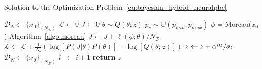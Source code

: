 \begin{algorithm}
    \caption{Solution to the Optimization Problem~\eqref{eq:bayesian_hybrid_neuralpbc}}
    \label{algo:bayes_neuralpbc}
    \small
    \begin{algorithmic}[1]
        \algrenewcommand\algorithmicindent{0em} %
        \State $\mathcal{D}_N \gets \{x_0\}_{(N_{\mathcal{D}})}$   
        \algrenewcommand\algorithmicindent{1.1em} %
        \State $\mathcal{L} \gets 0$ 
         
        \State $J \gets 0$ 
        \State $\theta \sim Q(\theta; z)$ 
            \State $p_s \sim \mathbb{U}(p_{min}, p_{max})$
            \State $\phi$ = Moreau($x_0$) \Comment Algorithm~\eqref{algo:moreau}
            \State $J \gets J + \ell(\phi; \theta)/N_{\mathcal{D}}$ 
            \EndFor
        \State $\mathcal{L} \gets \mathcal{L} + \frac{1}{N_{\theta}} \left(\log[P(J | \theta) P(\theta)] - \log[Q(\theta;z)]\right)$
        \EndFor
        \State $z \gets z + \alpha \nicefrac{\partial \mathcal{L}}{\partial z}$
        \State $\mathcal{D}_N \gets \{x_0\}_{(N_{\mathcal{D}})}$
        \State $i \;\:\gets i + 1$
        \EndWhile
        \State \textbf{return} $z$
    \end{algorithmic}
\end{algorithm}
